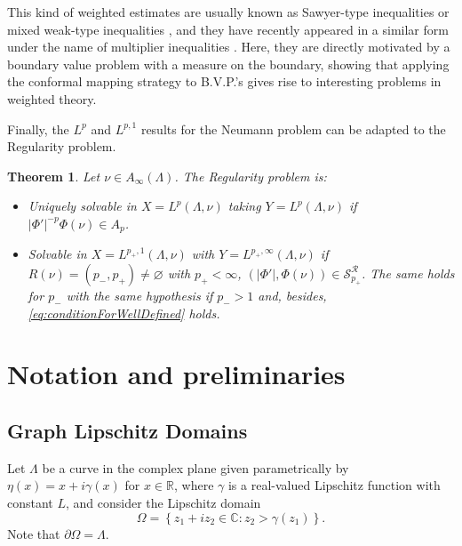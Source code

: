 \documentclass[12pt]{amsart}
\theoremstyle{plain}
\newtheorem{theorem}{Theorem}[section]
\theoremstyle{definition}
\numberwithin{equation}{section}
\begin{document}
This kind of weighted estimates are usually known as Sawyer-type inequalities or mixed weak-type inequalities \cite{SawyerCUMP, LiOmbrosiPerez, perezRoure}, and they have recently appeared in a similar form under the name of multiplier inequalities \cite{CruzUribeSweeting}. Here, they are directly motivated by a boundary value problem with a measure on the boundary, showing that applying the conformal mapping strategy to B.V.P.'s gives rise to interesting problems in weighted theory. 


Finally, the $L^p$ and $L^{p,1}$ results for the Neumann problem can be adapted to the Regularity problem.

\begin{theorem}\label{thm:regularitySolvability}
    Let $\nu\in A_{\infty}(\Lambda)$. The Regularity problem is:
    \begin{itemize}
        \item Uniquely solvable in $X=L^p(\Lambda,\nu)$ taking $Y=L^p(\Lambda,\nu)$ if $|\Phi'|^{-p}\Phi(\nu)\in A_p$.
        \item Solvable in $X=L^{p_{+},1}(\Lambda,\nu)$ with $Y=L^{p_{+},\infty}(\Lambda,\nu)$ if $R(\nu)=(p_{-},p_{+})\neq\varnothing$ with $p_{+}<\infty$, $(|\Phi'|,\Phi(\nu))\in \mathcal{S}_{p_{+}}^{\mathcal{R}}$. The same holds for $p_{-}$ with the same hypothesis if $p_{-}>1$ and, besides, \eqref{eq:conditionForWellDefined} holds.
    \end{itemize}
\end{theorem}









\section{Notation and preliminaries}\label{sec:notation}


\subsection{Graph Lipschitz Domains}

Let $\Lambda$ be a curve in the complex plane given parametrically by $\eta(x)=x+i\gamma(x)$ for $x \in \mathbb{R}$, where $\gamma$ is a real-valued Lipschitz function with constant $L$, and consider the Lipschitz domain
\begin{equation}\label{eq:omega}
\Omega
=
\left\{
z_1+i z_2 \in \mathbb{C}: z_2>\gamma(z_1)
\right\}.    
\end{equation}
Note that $\partial \Omega=\Lambda$.
\end{document}
